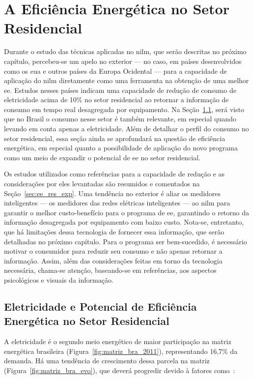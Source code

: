 \chapter{A Eficiência Energética no Setor Residencial}
\label{chap:ee_retorno}

Durante o estudo das técnicas aplicadas no \acs{nilm}, que serão
descritas no próximo capítulo, percebeu-se um apelo no exterior --- no
caso, em países desenvolvidos como os \acs{eua} e outros países da
Europa Ocidental --- para a capacidade de aplicação do \acs{nilm}
diretamente como uma ferramenta na obtenção de uma melhor \acs{ee}.
Estudos nesses países indicam uma capacidade de redução de consumo de eletricidade
acima de 10\% no setor residencial ao retornar a informação de
consumo em tempo real desagregada por equipamento. Na
Seção~\ref{sec:ee_setor_residencial}, será visto que no Brasil o
consumo nesse setor é também relevante, em especial quando levando em
conta apenas a eletricidade. Além de detalhar o perfil do consumo no
setor residencial, essa seção ainda se aprofundará na questão de
eficiência energética, em especial quanto a possibilidade de aplicação
do novo programa como um meio de expandir o potencial de \acs{ee} no
setor residencial.

Os estudos utilizados como referências para a capacidade de redução e
as considerações por eles levantadas são resumidos e comentados na
Seção~\ref{sec:ee_res_exp}. Uma tendência no exterior é aliar os
medidores inteligentes --- os medidores das redes elétricas
inteligentes --- ao \acs{nilm} para garantir o melhor
custo-benefício para o programa de \acs{ee}, garantindo o retorno da
informação desagregada por equipamento com baixo custo. Nota-se,
entretanto, que há limitações dessa tecnologia de fornecer essa
informação, que serão detalhadas no próximo capítulo. Para o programa
ser bem-sucedido, é necessário motivar o consumidor para reduzir seu
consumo e não apenas retornar a informação. Assim, além das
considerações feitas em torno da tecnologia necessária, chama-se
atenção, baseando-se em referências, aos aspectos psicológicos e
visuais da informação.

\section{Eletricidade e Potencial de Eficiência Energética
no Setor Residencial}
\label{sec:ee_setor_residencial}

A eletricidade é o segundo meio energético de maior participação na matriz
energética brasileira (Figura~\ref{fig:matriz_bra_2011}), representando 16,7\%
da demanda. Há uma tendência de crescimento dessa parcela na matriz
(Figura~\ref{fig:matriz_bra_evo}), que deverá progredir devido à fatores
como~\cite{iea_weo2010}:

